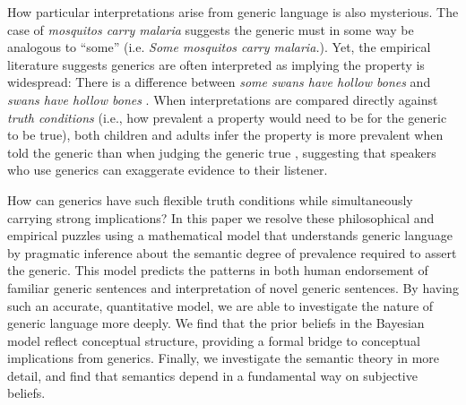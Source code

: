 \documentclass[12pt,letterpaper]{article}
\newcommand{\ndg}[1]{\textcolor{Green}{[ndg: #1]}}
\begin{document}

How particular interpretations arise from generic language is also mysterious.
The case of \emph{mosquitos carry malaria} suggests the generic must in some way be analogous to ``some'' (i.e. \emph{Some mosquitos carry malaria.}). 
Yet, the empirical literature suggests generics are often interpreted as implying the property is widespread:
There is a difference between \emph{some swans have hollow bones} and \emph{swans have hollow bones} \cite{Gelman2002}.
When interpretations are compared directly against \emph{truth conditions} (i.e., how prevalent a property would need to be for the generic to be true), both children and adults infer the property is more prevalent when told the generic than when judging the generic true \cite{Cimpian2010,Brandone2014}, suggesting that speakers who use generics can exaggerate evidence to their listener.

How can generics have such flexible truth conditions while simultaneously carrying strong implications?
In this paper we resolve these philosophical and empirical puzzles using a mathematical model that understands generic language by pragmatic inference about the semantic degree of prevalence required to assert the generic.  
This model predicts the patterns in both human endorsement of familiar generic sentences and interpretation of novel generic sentences. 
By having such an accurate, quantitative model, we are able to investigate the nature of generic language more deeply.
We find that the prior beliefs in the Bayesian model reflect conceptual structure, providing a formal bridge to conceptual implications from generics.
Finally, we investigate the semantic theory in more detail, and find that semantics depend in a fundamental way on subjective beliefs.
\end{document}
